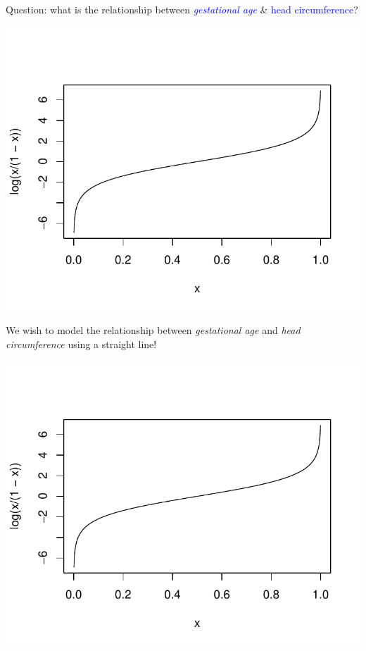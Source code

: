 \documentclass{article}\usepackage[]{graphicx}\usepackage[svgnames]{xcolor}
\makeatletter
\def\maxwidth{ %
  \ifdim\Gin@nat@width>\linewidth
    \linewidth
  \else
    \Gin@nat@width
  \fi
}
\newenvironment{knitrout}{}{} %
\makeatother
\begin{document}
Question: what is the relationship between \textcolor{Blue}{\emph{gestational age}} \& \textcolor{Blue}{head circumference}?
\begin{knitrout}
\color{fgcolor}

{\centering \includegraphics[width=\maxwidth]{figure/unnamed-chunk-18-1} 

}


\end{knitrout}
We wish to model the relationship between \emph{gestational age} and \emph{head
      circumference} using a straight line!
\begin{knitrout}
\color{fgcolor}

{\centering \includegraphics[width=\maxwidth]{figure/unnamed-chunk-19-1} 

}


\end{knitrout}
\end{document}
